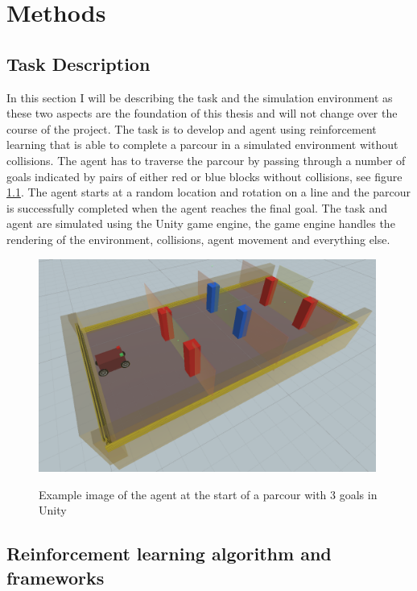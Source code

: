 \chapter{Methods}
\label{cha:Methods}



\section{Task Description}

In this section I will be describing the task and the simulation environment as these two aspects are the foundation of this thesis and will not change over the course of the project.
The task is to develop and agent using reinforcement learning that is able to complete a parcour in a simulated environment without collisions. The agent has to traverse the parcour by passing through a number of goals indicated by pairs of either red or blue blocks without collisions, see figure \ref*{task}. The agent starts at a random location and rotation on a line and the parcour is successfully completed when the agent reaches the final goal.
The task and agent are simulated using the Unity game engine, the game engine handles the rendering of the environment, collisions, agent movement and everything else.

\begin{figure}[h!]
     \centering
     \includegraphics[height=7cm]{Bilder/parcour.png}\\[2.5ex]
     \caption{Example image of the agent at the start of a parcour with 3 goals in Unity}
     \label{task}
\end{figure}





\section{Reinforcement learning algorithm and frameworks}

